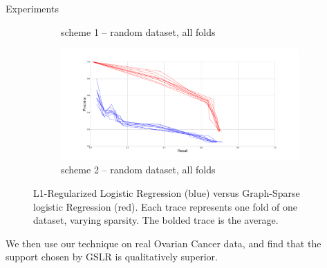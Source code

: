 \documentclass[svgnames,final]{beamer}
\begin{document}
\begin{frame}
\begin{columns}[T]
\begin{column}{.3\linewidth}
\begin{block}{Experiments}
\begin{figure}[h]
\begin{subfigure}{.5\textwidth}
		  \caption{scheme 1 -- random dataset, all folds}
		  \label{fig:sub3}
		\end{subfigure}%
		\begin{subfigure}{.5\textwidth}
		  \centering
		  \includegraphics[width=\linewidth]{images/3.pdf}
		  \caption{scheme 2 -- random dataset, all folds}
		  \label{fig:sub4}
		\end{subfigure}
		\caption{L1-Regularized Logistic Regression (blue) versus Graph-Sparse logistic Regression (red).
				Each trace represents one fold of one dataset, varying sparsity. The bolded trace is the average.}
		\label{fig:perf}
		\end{figure}

		We then use our technique on real Ovarian Cancer data,
		and find that the support chosen by GSLR is qualitatively superior.

	\end{block}

	\vspace{2cm}





\end{column}
\end{columns}
\end{frame}
\end{document}
